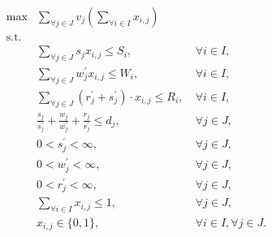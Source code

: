 \begin{align}
    \max & \sum_{\forall j \in J} v_j \left(\sum_{\forall i \in I} x_{i,j}\right)\label{eq:objective}\\
    \mbox{s.t.} \nonumber \\
    & \sum_{\forall j \in J} s_j x_{i,j} \leq S_i, &~ \forall i \in I,\label{eq:server_storage_constraint}\\
    & \sum_{\forall j \in J} w^{'}_j x_{i,j} \leq W_i, &~ \forall i \in I,\label{eq:server_computation_constraint}\\
    & \sum_{\forall j \in J} (r^{'}_j + s^{'}_j) \cdot x_{i,j} \leq R_i, &~ \forall i \in I,\label{eq:server_communication_constraint}\\
    & \frac{s_j}{s^{'}_j} + \frac{w_j}{w^{'}_j} + \frac{r_j}{r^{'}_j} \leq d_j, &~ \forall{j \in J},\label{eq:task_deadline}\\ 
    & 0 < s^{'}_j < \infty, &~ \forall{j \in J,}\label{eq:loading_speeds}\\
    & 0 < w^{'}_j < \infty, &~ \forall{j \in J,}\label{eq:compute_speeds}\\
    & 0 < r^{'}_j < \infty, &~ \forall{j \in J,}\label{eq:sending_speeds}\\
    & \sum_{\forall i \in I} x_{i,j} \leq 1, &~ \forall j \in J,\label{eq:server_task_allocation}\\
    & x_{i,j} \in \{0, 1\}, &~ \forall{i \in I},\forall{j \in J}.\label{eq:task_allocation}
\end{align}

